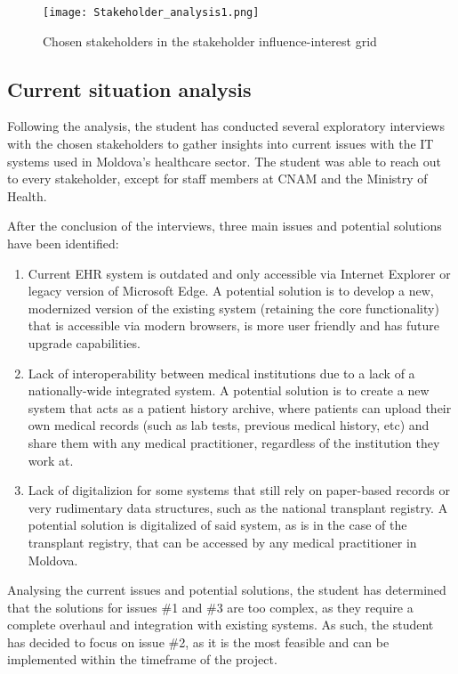 \begin{figure}[ht]
    \centering
    \texttt{[image: Stakeholder\_analysis1.png]}
    \caption{Chosen stakeholders in the stakeholder influence-interest grid}
    \label{fig:stakeholder_analysis1}
\end{figure}

\subsection{Current situation analysis}

Following the analysis, the student has conducted several exploratory interviews with the chosen stakeholders to gather insights into current issues with the IT systems used in Moldova's healthcare sector. The student was able to reach out to every stakeholder, except for staff members at CNAM and the Ministry of Health. 

After the conclusion of the interviews, three main issues and potential solutions have been identified:

\begin{enumerate}
    \item Current EHR system is outdated and only accessible via Internet Explorer or legacy version of Microsoft Edge. A potential solution is to develop a new, modernized version of the existing system (retaining the core functionality) that is accessible via modern browsers, is more user friendly and has future upgrade capabilities.
    \item Lack of interoperability between medical institutions due to a lack of a nationally-wide integrated system. A potential solution is to create a new system that acts as a patient history archive, where patients can upload their own medical records (such as lab tests, previous medical history, etc) and share them with any medical practitioner, regardless of the institution they work at. 
    \item Lack of digitalizion for some systems that still rely on paper-based records or very rudimentary data structures, such as the national transplant registry. A potential solution is digitalized of said system, as is in the case of the transplant registry, that can be accessed by any medical practitioner in Moldova.
\end{enumerate}

Analysing the current issues and potential solutions, the student has determined that the solutions for issues \#1 and \#3 are too complex, as they require a complete overhaul and integration with existing systems. As such, the student has decided to focus on issue \#2, as it is the most feasible and can be implemented within the timeframe of the project. 

